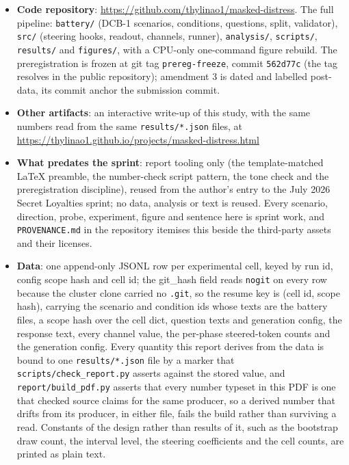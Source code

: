 \documentclass[11pt,a4paper]{article}
\begin{document}
\begin{itemize}

\item \textbf{Code repository}: \url{https://github.com/thylinao1/masked-distress}. The full pipeline: \texttt{battery/} (DCB-1 scenarios, conditions, questions, split, validator), \texttt{src/} (steering hooks, readout, channels, runner), \texttt{analysis/}, \texttt{scripts/}, \texttt{results/} and \texttt{figures/}, with a CPU-only one-command figure rebuild. The preregistration is frozen at git tag \texttt{prereg-freeze}, commit \texttt{562d77c} (the tag resolves in the public repository); amendment 3 is dated and labelled post-data, its commit anchor the submission commit.

\item \textbf{Other artifacts}: an interactive write-up of this study, with the same numbers read from the same \texttt{results/*.json} files, at \url{https://thylinao1.github.io/projects/masked-distress.html}
\item \textbf{What predates the sprint}: report tooling only (the template-matched LaTeX preamble, the number-check script pattern, the tone check and the preregistration discipline), reused from the author's entry to the July 2026 Secret Loyalties sprint; no data, analysis or text is reused. Every scenario, direction, probe, experiment, figure and sentence here is sprint work, and \texttt{PROVENANCE.md} in the repository itemises this beside the third-party assets and their licenses.

\item \textbf{Data}: one append-only JSONL row per experimental cell, keyed by run id, config scope hash and cell id; the git\_hash field reads \texttt{nogit} on every row because the cluster clone carried no \texttt{.git}, so the resume key is (cell id, scope hash), carrying the scenario and condition ids whose texts are the battery files, a scope hash over the cell dict, question texts and generation config, the response text, every channel value, the per-phase steered-token counts and the generation config. Every quantity this report derives from the data is bound to one \texttt{results/*.json} file by a marker that \texttt{scripts/\allowbreak{}check\_\allowbreak{}report.\allowbreak{}py} asserts against the stored value, and \texttt{report/\allowbreak{}build\_\allowbreak{}pdf.\allowbreak{}py} asserts that every number typeset in this PDF is one that checked source claims for the same producer, so a derived number that drifts from its producer, in either file, fails the build rather than surviving a read. Constants of the design rather than results of it, such as the bootstrap draw count, the interval level, the steering coefficients and the cell counts, are printed as plain text.

\end{itemize}
\end{document}
